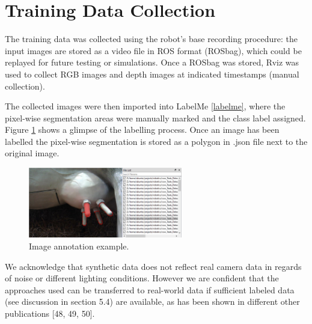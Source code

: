 \section{Training Data Collection}
The training data was collected using the robot's base recording procedure: the input images are stored as a video file in ROS format (ROSbag), which could be replayed for future testing or simulations. Once a ROSbag was stored, Rviz was used to collect RGB images and depth images at indicated timestamps (manual collection).

The collected images were then imported into LabelMe 
\ref{labelme}, where the pixel-wise segmentation areas were manually marked and the class label assigned. Figure \ref{fig:cow_labelme} shows a glimpse of the labelling process. Once an image has been labelled the pixel-wise segmentation is stored as a polygon in .json file next to the original image.

\begin{figure}[h]
    \centering
    \includegraphics[width=0.6\textwidth]{images/cow_labelme.png}
    \caption{Image annotation example.}
    \label{fig:cow_labelme}
\end{figure}
    
We acknowledge that synthetic data does not reﬂect real camera data in regards of noise or diﬀerent
lighting conditions. However we are conﬁdent that the approaches used can be transferred to real-world
data if suﬃcient labeled data (see discussion in section 5.4) are available, as has been shown in diﬀerent
other publications [48, 49, 50].

